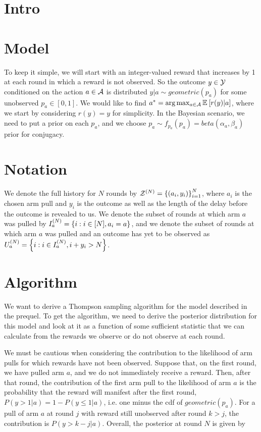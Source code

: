 \documentclass{article}
\begin{document}
\section{Intro} \label{sec:intro}

\section{Model} \label{sec:model}

To keep it simple, we will start with an integer-valued reward that increases by 1 at each round in which a reward is not observed. So the outcome $y \in \mathcal{Y}$ conditioned on the action $a \in \mathcal{A}$ is distributed $y | a \sim geometric(p_a)$ for some unobserved $p_a \in [0,1]$. We would like to find $a^* = \textnormal{arg} \max_{a \in \mathcal{A}} \mathbb{E}_{} \left[ r(y) | a \right]$, where we start by considering $r(y) = y$ for simplicity. In the Bayesian scenario, we need to put a prior on each $p_a$, and we choose $p_a \sim f_{p_a}(p_a) = beta(\alpha_a, \beta_a)$ prior for conjugacy.

\section{Notation} \label{subsec:notation}
We denote the full history for $N$ rounds by $\mathcal{Z}^{(N)} = \left \{ (a_i, y_i) \right \}_{i=1}^N$, where $a_i$ is the chosen arm pull and $y_i$ is the outcome as well as the length of the delay before the outcome is revealed to us. We denote the subset of rounds at which arm $a$ was pulled by $I_a^{(N)} = \left \{ i: i \in [N], a_i = a \right \}$, and we denote the subset of rounds at which arm $a$ was pulled and an outcome has yet to be observed as $U_a^{(N)} = \left \{ i : i \in I_a^{(N)}, i + y_i > N \right \}$.

\section{Algorithm} \label{sec:alg}
We want to derive a Thompson sampling algorithm for the model described in the prequel. To get the algorithm, we need to derive the posterior distribution for this model and look at it as a function of some sufficient statistic that we can calculate from the rewards we observe or do not observe at each round. 

We must be cautious when considering the contribution to the likelihood of arm pulls for which rewards have not been observed. Suppose that, on the first round, we have pulled arm $a$, and we do not immediately receive a reward. Then, after that round, the contribution of the first arm pull to the likelihood of arm $a$ is the probability that the reward will manifest after the first round, $P(y > 1 | a) = 1 - P(y \leq 1 | a)$, i.e. one minus the cdf of $geometric(p_a)$. For a pull of arm $a$ at round $j$ with reward still unobserved after round $k > j$, the contribution is $P(y > k - j | a)$. Overall, the posterior at round $N$ is given by
\end{document}
